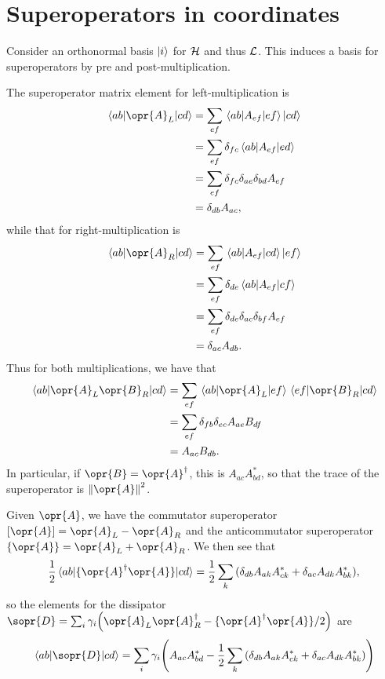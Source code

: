 \documentclass[../thesis.tex]{subfiles}
\begin{document}
\section{Superoperators in coordinates}

Consider an orthonormal basis $\ket{i}$ for $\mathcal{H}$ and thus $\mathcal{L}$. This
induces a basis for superoperators by pre and post-multiplication.

The superoperator matrix element for left-multiplication is
\begin{align}
  \mel{ab}{\opr{A}_L}{cd}
  &= \sum_{ef} \mel{ab}{A_{ef}}{ef}\ket{cd} \\
  &= \sum_{ef} \delta_{fc} \mel{ab}{A_{ef}}{ed} \\
  &= \sum_{ef} \delta_{fc} \delta_{ae} \delta_{bd} A_{ef} \\
  &= \delta_{db} A_{ac},
\end{align}
while that for right-multiplication is
\begin{align}
  \mel{ab}{\opr{A}_R}{cd}
  &= \sum_{ef} \mel{ab}{A_{ef}}{cd}\ket{ef} \\
  &= \sum_{ef} \delta_{de} \mel{ab}{A_{ef}}{cf} \\
  &= \sum_{ef} \delta_{de} \delta_{ac} \delta_{bf} A_{ef} \\
  &= \delta_{ac} A_{db}.
\end{align}
Thus for both multiplications, we have that
\begin{align}
  \mel{ab}{\opr{A}_L\opr{B}_R}{cd}
  &= \sum_{ef} \mel{ab}{\opr{A}_L}{ef}\mel{ef}{\opr{B}_R}{cd} \\
  &= \sum_{ef} \delta_{fb} \delta_{ec} A_{ae} B_{df} \\
  &= A_{ac} B_{db}.
\end{align}
In particular, if $\opr{B} = \opr{A}^\dag$, this is $A_{ac} A_{bd}^*$, so that
the trace of the superoperator is $\norm{\opr{A}}^2$.

Given $\opr{A}$, we have the commutator superoperator $[\opr{A}] = \opr{A}_L -
\opr{A}_R$ and the anticommutator superoperator $\{\opr{A}\} = \opr{A}_L +
\opr{A}_R$. We then see that
\begin{equation}
  \frac{1}{2}\mel{ab}{\{\opr{A}^\dag \opr{A}\}}{cd}
  = \frac{1}{2}\sum_k\qty(\delta_{db} A_{ak}A_{ck}^* + \delta_{ac} A_{dk}A_{bk}^*),
\end{equation}
so the elements for the dissipator $\sopr{D} = \sum_i \gamma_i\qty(\opr{A}_L
\opr{A}_R^\dag - \{\opr{A}^\dag \opr{A}\}/2)$ are
\begin{equation}
  \mel{ab}{\sopr{D}}{cd}
  = \sum_i \gamma_i \qty(A_{ac}A_{bd}^* - \frac{1}{2}\sum_k\qty(\delta_{db} A_{ak}A_{ck}^* + \delta_{ac} A_{dk}A_{bk}^*))
\end{equation}
\end{document}
